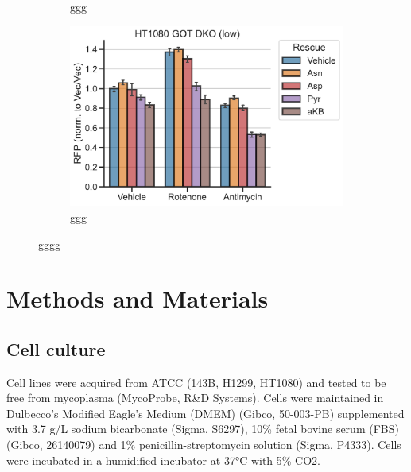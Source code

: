 \begin{figure}
\begin{subfigure}[b]{0.4\textwidth}
         \caption{ggg}
         \label{fig:ch2:143B_Atp_ATF4rep}
     \end{subfigure}
     \hspace{0.06\textwidth}
     \begin{subfigure}[b]{0.4\textwidth}
         \includegraphics[width=\textwidth]{figures/chap2/HT1080_GOT_DKO_ETCinhib_ATF4rep.pdf}
         \caption{ggg}
         \label{fig:ch2:HT1080_GOT_DKO_ETCinhib_ATF4rep}
     \end{subfigure}
        \caption[ggg]{
        gggg
        }
        \label{fig:ch2:ISR}
\end{figure}











\section{Methods and Materials}

\subsection{Cell culture}
Cell lines were acquired from ATCC (143B, H1299, HT1080) and tested to be free from mycoplasma (MycoProbe, R\&D Systems).
Cells were maintained in Dulbecco’s Modified Eagle’s Medium (DMEM) (Gibco, 50-003-PB) supplemented with 3.7 g/L sodium bicarbonate (Sigma, S6297), 10\% fetal bovine serum (FBS) (Gibco, 26140079) and 1\% penicillin-streptomycin solution (Sigma, P4333).
Cells were incubated in a humidified incubator at 37°C with 5\% CO2.


